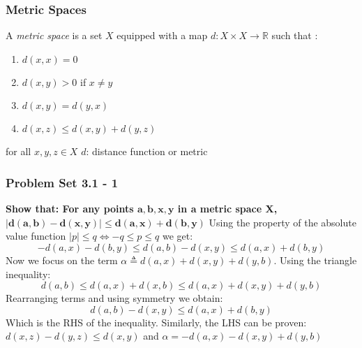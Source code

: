 \begin{frame}
    \frametitle{Metric Spaces}
A \textit{metric space} is a set $X$ equipped with a map $d: X\times X
\rightarrow \mathbb{R}$ such that :
\begin{enumerate}
    \item $d(x,x) = 0$
    \item $d(x,y)>0$ if $x\neq y$
    \item $d(x,y) = d(y,x)$
    \item $d(x,z) \leq d(x,y)+d(y,z)$
\end{enumerate}
    
for all $x,y,z \in X$ \hfill\break
\hfill\break
$d$: distance function or metric
\end{frame}

\begin{frame}
\frametitle{Problem Set 3.1 - 1}
\textbf{Show that: For any points $\bm{a,b,x,y}$ in a metric space X,}
$\bm{|d(a,b) - d(x,y)| \leq d(a,x) + d(b,y)}$\hfill\break
\hfill\break
Using the property of the absolute value function $|p|\leq q \iff -q\leq p \leq
q$ we get:\hfill\break
\begin{equation*}
- d(a,x) - d(b,y) \leq d(a,b) - d(x,y) \leq  d(a,x) + d(b,y)
\end{equation*}
\hfill\break
Now we focus on the term $\alpha \triangleq d(a,x) + d(x, y)  + d(y, b)$.
Using the triangle inequality:
\begin{equation*}
d(a,b) \leq d(a,x) + d(x, b) \leq  d(a,x) + d(x, y)  + d(y, b) 
\end{equation*}
Rearranging terms and using symmetry we obtain:
\begin{equation*}
d(a,b) - d(x,y) \leq  d(a,x) + d(b,y)
\end{equation*}
Which is the RHS of the inequality. Similarly, the LHS can be proven: $d(x,z)
- d(y,z) \leq d(x,y)$ and $\alpha = -d(a,x) -d(x, y)  + d(y, b)$
\end{frame}

